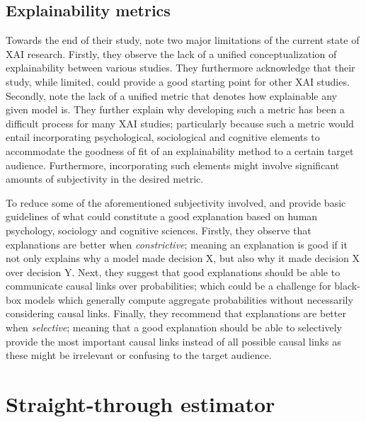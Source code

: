 \subsection{Explainability metrics}

\label{section:xai_metrics}

Towards the end of their study, \citet{arrieta2020explainable} note two major
limitations of the current state of XAI research. Firstly, they observe the lack
of a unified conceptualization of explainability between various studies. They
furthermore acknowledge that their study, while limited, could provide a good
starting point for other XAI studies. Secondly, \citet{arrieta2020explainable}
note the lack of a unified metric that denotes how explainable any given model
is. They further explain why developing such a metric has been a difficult
process for many XAI studies; particularly because such a metric would entail
incorporating psychological, sociological and cognitive elements to accommodate
the goodness of fit of an explainability method to a certain target audience.
Furthermore, incorporating such elements might involve significant amounts of
subjectivity in the desired metric.

To reduce some of the aforementioned subjectivity involved, \citet{MILLER20191}
and \citet{arrieta2020explainable} provide basic guidelines of what could
constitute a good explanation based on human psychology, sociology and cognitive
sciences. Firstly, they observe that explanations are better when
\textit{constrictive}; meaning an explanation is good if it not only explains
why a model made decision X, but also why it made decision X over decision Y.
Next, they suggest that good explanations should be able to communicate causal
links over probabilities; which could be a challenge for black-box models which
generally compute aggregate probabilities without necessarily considering causal
links. Finally, they recommend that explanations are better when
\textit{selective}; meaning that a good explanation should be able to
selectively provide the most important causal links instead of all possible
causal links as these might be irrelevant or confusing to the target audience.

\section{Straight-through estimator}

\label{section:ste}

